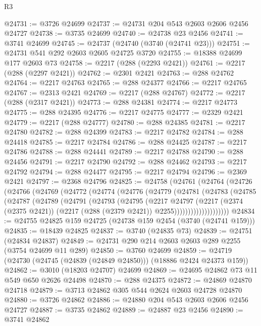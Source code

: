 \begin{lexlean}{R3}
\begin{coremodule}
@24731 := @3726 @24699
@24737 := @24731 @204 @543 @2603 @2606 @2456 @24727
@24738 := @3735 @24699
@24740 := @24738 @23 @2456
@24741 := @3741 @24699
@24745 := @24737 (@24740 (@3740 (@24741 @23)))
@24751 := @24731 @541 @292 @2603 @2605 @24725 @3720
@24755 := @18388 @24699 @177 @2603 @73
@24758 := @2217 (@288 (@2293 @2421))
@24761 := @2217 (@288 (@2297 @2421))
@24762 := @2301 @2421
@24763 := @288 @24762
@24764 := @2217 @24763
@24765 := @288 @24377
@24766 := @2217 @24765
@24767 := @2313 @2421
@24769 := @2217 (@288 @24767)
@24772 := @2217 (@288 (@2317 @2421))
@24773 := @288 @24381
@24774 := @2217 @24773
@24775 := @288 @24395
@24776 := @2217 @24775
@24777 := @2329 @2421
@24779 := @2217 (@288 @24777)
@24780 := @288 @24385
@24781 := @2217 @24780
@24782 := @288 @24399
@24783 := @2217 @24782
@24784 := @288 @24418
@24785 := @2217 @24784
@24786 := @288 @24425
@24787 := @2217 @24786
@24788 := @288 @24441
@24789 := @2217 @24788
@24790 := @288 @24456
@24791 := @2217 @24790
@24792 := @288 @24462
@24793 := @2217 @24792
@24794 := @288 @24477
@24795 := @2217 @24794
@24796 := @2369 @2421
@24797 := @2368 @24796
@24825 := @24758
    (@24761
      (@24764
        (@24726
          (@24766
            (@24769
              (@24772
                (@24774
                  (@24776
                    (@24779
                      (@24781
                        (@24783
                          (@24785
                            (@24787
                              (@24789
                                (@24791
                                  (@24793
                                    (@24795
                                      (@2217
                                        @24797
                                        (@2217
                                          (@2374 (@2375 @2421))
                                          (@2217 (@288 (@2379 @2421)) @2255))))))))))))))))))))
@24834 := @24755 @24825 @159 @24725 (@24738 @159 @2454 (@3740 (@24741 @159)))
@24835 := @18439 @24825
@24837 := @3740 (@24835 @73)
@24839 := @24751 (@24834 @24837)
@24849 := @24731 @290 @214 @2603 @2603 @289 @2255 (@3754 @24699 @11 @289)
@24850 := @3760 @24699
@24859 := @24719 (@24730 (@24745 (@24839 (@24849 @24850))) (@18886 @2424 @24373 @159))
@24862 := @3010 (@18203 @24707) @24699
@24869 := @24695 @24862 @73 @11 @549 @650 @2626 @24498
@24870 := @288 @24375
@24872 := @24869 @24870 @24718
@24879 := @3713 @24862 @305 @544 @2624 @2603 @24728 @24870
@24880 := @3726 @24862
@24886 := @24880 @204 @543 @2603 @2606 @2456 @24727
@24887 := @3735 @24862
@24889 := @24887 @23 @2456
@24890 := @3741 @24862

\end{coremodule}
\end{lexlean}
